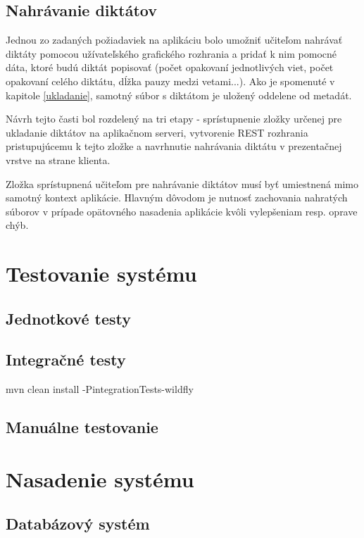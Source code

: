 \documentclass[12pt,oneside]{fithesis2}
\begin{document}
   \section{Nahrávanie diktátov}
   \par Jednou zo zadaných požiadaviek na aplikáciu bolo umožniť učiteľom nahrávať diktáty pomocou užívateľského grafického rozhrania a pridať k nim pomocné dáta, ktoré budú diktát popisovať (počet opakovaní jednotlivých viet, počet opakovaní celého diktátu, dĺžka pauzy medzi vetami...). Ako je spomenuté v kapitole \ref{ukladanie}, samotný súbor s diktátom je uložený oddelene od metadát.
   \par Návrh tejto časti bol rozdelený na tri etapy - sprístupnenie zložky určenej pre ukladanie diktátov na aplikačnom serveri, vytvorenie REST rozhrania pristupujúcemu k tejto zložke a navrhnutie nahrávania diktátu v prezentačnej vrstve na strane klienta.
   \par Zložka sprístupnená učiteľom pre nahrávanie diktátov musí byť umiestnená mimo samotný kontext aplikácie. Hlavným dôvodom je nutnosť zachovania nahratých súborov v prípade opätovného nasadenia aplikácie kvôli vylepšeniam resp. oprave chýb.
   \par 
   \par
      
    \chapter{Testovanie systému}
      \section{Jednotkové testy}
      \section{Integračné testy}
      \par mvn clean install -PintegrationTests-wildfly
      \section{Manuálne testovanie}
    \chapter{Nasadenie systému} \label{nasadenie}
      \section{Databázový systém}
\end{document}
